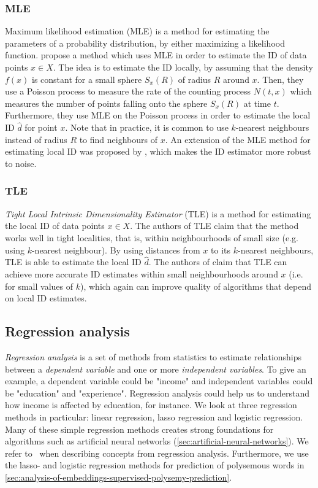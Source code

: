 \subsubsection{MLE}
\label{sec:id-estimation-mle}
Maximum likelihood estimation (MLE) is a method for estimating the parameters of a probability distribution, by either maximizing a likelihood function. \cite{Levina2004} propose a method which uses MLE in order to estimate the ID of data points $x \in X$. The idea is to estimate the ID locally, by assuming that the density $f(x)$ is constant for a small sphere $S_x(R)$ of radius $R$ around $x$. Then, they use a Poisson process to measure the rate of the counting process $N(t, x)$ which measures the number of points falling onto the sphere $S_x(R)$ at time $t$. Furthermore, they use MLE on the Poisson process in order to estimate the local ID $\hat{d}$ for point $x$. Note that in practice, it is common to use $k$-nearest neighbours instead of radius $R$ to find neighbours of $x$. An extension of the MLE method for estimating local ID was proposed by \cite{Haro2008}, which makes the ID estimator more robust to noise.

\subsubsection{TLE}
\label{sec:id-estimation-tle}
\textit{Tight Local Intrinsic Dimensionality Estimator} (TLE) \cite{Amsaleg2019} is a method for estimating the local ID of data points $x \in X$. The authors of TLE claim that the method works well in tight localities, that is, within neighbourhoods of small size (e.g. using $k$-nearest neighbour). By using distances from $x$ to its $k$-nearest neighbours, TLE is able to estimate the local ID $\hat{d}$. The authors of \cite{Amsaleg2019} claim that TLE can achieve more accurate ID estimates within small neighbourhoods around $x$ (i.e. for small values of $k$), which again can improve quality of algorithms that depend on local ID estimates.

\subsection{Regression analysis}
\label{sec:regression-analysis}
\textit{Regression analysis} is a set of methods from statistics to estimate relationships between a \textit{dependent variable} and one or more \textit{independent variables}. To give an example, a dependent variable could be "income" and independent variables could be "education" and "experience". Regression analysis could help us to understand how income is affected by education, for instance. We look at three regression methods in particular: linear regression, lasso regression and logistic regression. Many of these simple regression methods creates strong foundations for algorithms such as artificial neural networks (\cref{sec:artificial-neural-networks}). We refer to \cites{James2013}{fox2015applied} \, when describing concepts from regression analysis. Furthermore, we use the lasso- and logistic regression methods for prediction of polysemous words in \cref{sec:analysis-of-embeddings-supervised-polysemy-prediction}.

